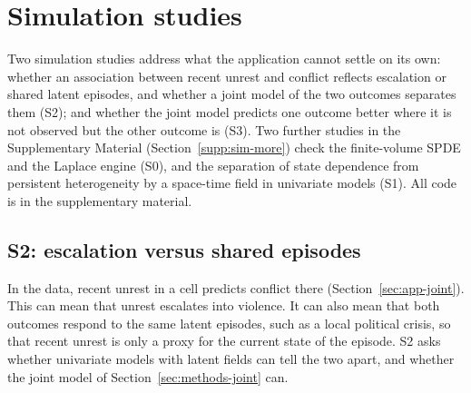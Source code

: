 \section{Simulation studies}\label{sec:simulation}

Two simulation studies address what the application cannot settle on its own: whether
an association between recent unrest and conflict reflects escalation or shared latent
episodes, and whether a joint model of the two outcomes separates them (S2); and
whether the joint model predicts one outcome better where it is not observed but the
other outcome is (S3). Two further studies in the Supplementary Material
(Section~\ref{supp:sim-more}) check the finite-volume SPDE and the Laplace engine (S0),
and the separation of state dependence from persistent heterogeneity by a space-time
field in univariate models (S1). All code is in the supplementary material.

\subsection{S2: escalation versus shared episodes}\label{sec:sim-joint}

In the data, recent unrest in a cell predicts conflict there
(Section~\ref{sec:app-joint}). This can mean that unrest escalates into violence. It can
also mean that both outcomes respond to the same latent episodes, such as a local
political crisis, so that recent unrest is only a proxy for the current state of the
episode. S2 asks whether univariate models with latent fields can tell the two apart,
and whether the joint model of Section~\ref{sec:methods-joint} can.

